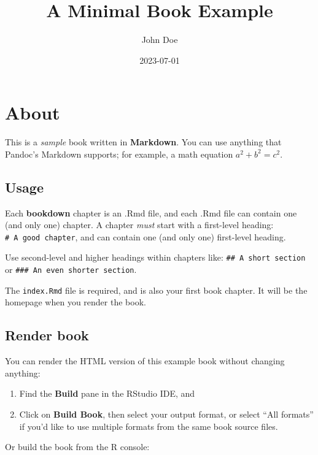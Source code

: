 \documentclass[
]{book}
\title{A Minimal Book Example}
\author{John Doe}
\date{2023-07-01}
\begin{document}
\maketitle

{
\setcounter{tocdepth}{1}
\tableofcontents
}
\hypertarget{about}{%
\chapter{About}\label{about}}

This is a \emph{sample} book written in \textbf{Markdown}. You can use anything that Pandoc's Markdown supports; for example, a math equation \(a^2 + b^2 = c^2\).

\hypertarget{usage}{%
\section{Usage}\label{usage}}

Each \textbf{bookdown} chapter is an .Rmd file, and each .Rmd file can contain one (and only one) chapter. A chapter \emph{must} start with a first-level heading: \texttt{\#\ A\ good\ chapter}, and can contain one (and only one) first-level heading.

Use second-level and higher headings within chapters like: \texttt{\#\#\ A\ short\ section} or \texttt{\#\#\#\ An\ even\ shorter\ section}.

The \texttt{index.Rmd} file is required, and is also your first book chapter. It will be the homepage when you render the book.

\hypertarget{render-book}{%
\section{Render book}\label{render-book}}

You can render the HTML version of this example book without changing anything:

\begin{enumerate}
\def\labelenumi{\arabic{enumi}.}
\item
  Find the \textbf{Build} pane in the RStudio IDE, and
\item
  Click on \textbf{Build Book}, then select your output format, or select ``All formats'' if you'd like to use multiple formats from the same book source files.
\end{enumerate}

Or build the book from the R console:
\end{document}
